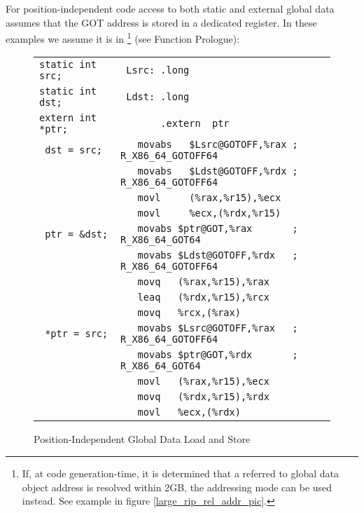 For position-independent code access to both static and external global
data assumes that the GOT address is stored in a dedicated register.
In these examples we assume it is in \footnote{If,
at code generation-time, it is determined that a referred to global data
object address is resolved within 2GB, the 
addressing mode can be used instead. See example in figure
\ref{large_rip_rel_addr_pic}.} (see Function Prologue):

\begin{figure}[H]
\Hrule
\caption{Position-Independent Global Data Load and Store}
\label{large_pic_data_load_store}
\begin{center}
\begin{footnotesize}
\begin{tabular}{|l|l|}
\hline
\verb#static int src;  # & \verb# Lsrc: .long                      # \\
\verb#static int dst;  # & \verb# Ldst: .long                      # \\
\verb#extern int *ptr; # & \verb#       .extern  ptr               # \\
\hline 
\verb# dst = src;      # & \verb#   movabs   $Lsrc@GOTOFF,%rax ; R_X86_64_GOTOFF64 # \\
\verb#                 # & \verb#   movabs   $Ldst@GOTOFF,%rdx ; R_X86_64_GOTOFF64 # \\
\verb#                 # & \verb#   movl     (%rax,%r15),%ecx  # \\
\verb#                 # & \verb#   movl     %ecx,(%rdx,%r15)  # \\
\hline
\verb# ptr = &dst;     # & \verb#   movabs $ptr@GOT,%rax       ; R_X86_64_GOT64 # \\
\verb#                 # & \verb#   movabs $Ldst@GOTOFF,%rdx   ; R_X86_64_GOTOFF64 # \\
\verb#                 # & \verb#   movq   (%rax,%r15),%rax    # \\
\verb#                 # & \verb#   leaq   (%rdx,%r15),%rcx    # \\
\verb#                 # & \verb#   movq   %rcx,(%rax)         # \\
\hline
\verb# *ptr = src;     # & \verb#   movabs $Lsrc@GOTOFF,%rax   ; R_X86_64_GOTOFF64 # \\
\verb#                 # & \verb#   movabs $ptr@GOT,%rdx       ; R_X86_64_GOT64 # \\
\verb#                 # & \verb#   movl   (%rax,%r15),%ecx    # \\
\verb#                 # & \verb#   movq   (%rdx,%r15),%rdx    # \\
\verb#                 # & \verb#   movl   %ecx,(%rdx)         # \\
\hline
\end{tabular}
\end{footnotesize}
\end{center}
\end{figure}


